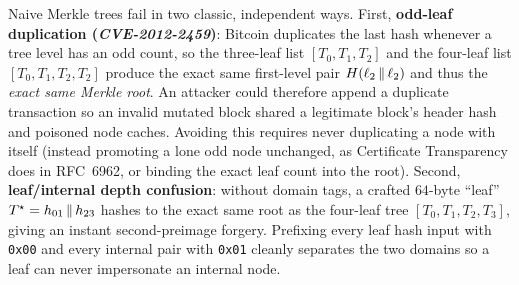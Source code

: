 \begin{trapbox}
Naive Merkle trees fail in two classic, independent ways. First, \textbf{odd-leaf duplication (\emph{CVE-2012-2459})}: Bitcoin duplicates the last hash whenever a tree level has an odd count, so the three-leaf list $[T_0, T_1, T_2]$ and the four-leaf list $[T_0, T_1, T_2, T_2]$ produce the exact same first-level pair $H(\ell_2 \,\|\, \ell_2)$ and thus the \emph{exact same Merkle root}. An attacker could therefore append a duplicate transaction so an invalid mutated block shared a legitimate block's header hash and poisoned node caches. Avoiding this requires never duplicating a node with itself (instead promoting a lone odd node unchanged, as Certificate Transparency does in RFC~6962, or binding the exact leaf count into the root). Second, \textbf{leaf/internal depth confusion}: without domain tags, a crafted $64$-byte ``leaf'' $T^\star = h_{01} \,\|\, h_{23}$ hashes to the exact same root as the four-leaf tree $[T_0, T_1, T_2, T_3]$, giving an instant second-preimage forgery. Prefixing every leaf hash input with \texttt{0x00} and every internal pair with \texttt{0x01} cleanly separates the two domains so a leaf can never impersonate an internal node.
\end{trapbox}

